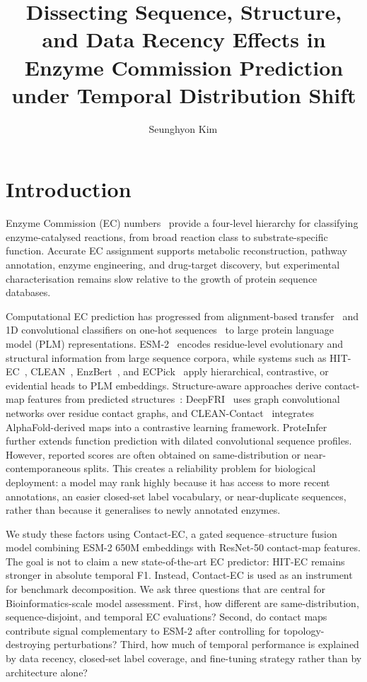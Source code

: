 \documentclass[namedate,contemporary,mediumone]{oup-authoring-template}
\title[Temporal EC Prediction]{Dissecting Sequence, Structure, and Data Recency Effects
in Enzyme Commission Prediction under Temporal Distribution Shift}
\author[1,$\ast$]{Seunghyon Kim\,\ORCID{0009-0002-0708-748X}}
\begin{document}
\maketitle

\section{Introduction}

Enzyme Commission (EC) numbers~\citep{mcdonald2023} provide a four-level hierarchy
for classifying enzyme-catalysed reactions, from broad reaction class to
substrate-specific function. Accurate EC assignment supports metabolic
reconstruction, pathway annotation, enzyme engineering, and drug-target
discovery, but experimental characterisation remains slow relative to the
growth of protein sequence databases.

Computational EC prediction has progressed from alignment-based
transfer~\citep{altschul1990} and 1D convolutional classifiers on one-hot
sequences~\citep{ryu2019,dalkiran2018} to large protein language model (PLM)
representations. ESM-2~\citep{lin2023} encodes residue-level evolutionary and
structural information from large sequence corpora, while systems such as
HIT-EC~\citep{dumontet2026}, CLEAN~\citep{yu2023}, EnzBert~\citep{buton2023},
and ECPick~\citep{han2024} apply hierarchical, contrastive, or evidential heads
to PLM embeddings. Structure-aware approaches derive contact-map features from
predicted structures~\citep{jumper2021,varadi2022}: DeepFRI~\citep{gligorijevic2021}
uses graph convolutional networks over residue contact graphs, and
CLEAN-Contact~\citep{ayres2024} integrates AlphaFold-derived maps into a
contrastive learning framework. ProteInfer~\citep{sanderson2023} further extends
function prediction with dilated convolutional sequence profiles. However,
reported scores are often obtained on same-distribution or near-contemporaneous
splits. This creates a reliability problem for biological deployment: a model
may rank highly because it has access to more recent annotations, an easier
closed-set label vocabulary, or near-duplicate sequences, rather than because
it generalises to newly annotated enzymes.

We study these factors using Contact-EC, a gated sequence--structure fusion model
combining ESM-2 650M embeddings with ResNet-50 contact-map features. The goal is
not to claim a new state-of-the-art EC predictor: HIT-EC remains stronger in
absolute temporal F1. Instead, Contact-EC is used as an instrument for benchmark
decomposition. We ask three questions that are central for Bioinformatics-scale
model assessment. First, how different are same-distribution, sequence-disjoint,
and temporal EC evaluations? Second, do contact maps contribute signal
complementary to ESM-2 after controlling for topology-destroying perturbations?
Third, how much of temporal performance is explained by data recency,
closed-set label coverage, and fine-tuning strategy rather than by architecture alone?
\end{document}
